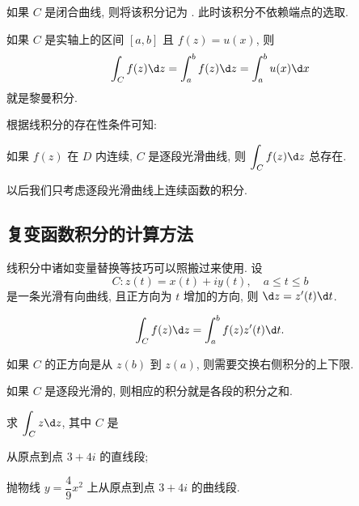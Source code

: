 如果 $C$ 是闭合曲线, 则将该积分记为 .
此时该积分不依赖端点的选取.

如果 $C$ 是实轴上的区间 $[a,b]$ 且 $f(z)=u(x)$, 则
\[
  \int_Cf(z)\d z=\int_a^bf(z)\d z=\int_a^b u(x)\d x
\]
就是黎曼积分.

根据线积分的存在性条件可知:
\begin{theorem}
  如果 $f(z)$ 在 $D$ 内连续, $C$ 是逐段光滑曲线, 则 $\displaystyle\int_Cf(z)\d z$ 总存在.
\end{theorem}

以后我们\alert{只考虑逐段光滑曲线上连续函数的积分}.


\subsection{复变函数积分的计算方法}

线积分中诸如变量替换等技巧可以照搬过来使用. 设
\[
  C:z(t)=x(t)+iy(t),\quad a\le t\le b
\]
是一条光滑有向曲线, 且正方向为 $t$ 增加的方向, 则 $\d z=z'(t)\d t$.

\begin{theorem}
  \[
    \int_Cf(z)\d z=\int_a^b f(z)z'(t)\d t.
  \]
\end{theorem}
如果 $C$ 的正方向是从 $z(b)$ 到 $z(a)$, 则需要交换右侧积分的上下限.

如果 $C$ 是逐段光滑的, 则相应的积分就是各段的积分之和.

\begin{example}\label{exam:integral-z}
  求 $\displaystyle\int_Cz\d z$, 其中 $C$ 是
  \begin{enumpar}
    \item 从原点到点 $3+4i$ 的直线段;
    \item 抛物线 $y=\dfrac49x^2$ 上从原点到点 $3+4i$ 的曲线段.
  \end{enumpar}
\end{example}

\begin{figure}[!hb]
  \centering
  \begin{minipage}{.48\textwidth}
    \centering
  \end{minipage}
  \begin{minipage}{.48\textwidth}
    \centering
  \end{minipage}
\end{figure}

